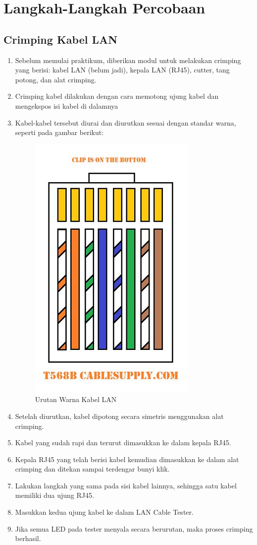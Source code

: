 
\section{Langkah-Langkah Percobaan}

\subsection{Crimping Kabel LAN}

\begin{enumerate}
  \item Sebelum memulai praktikum, diberikan modul untuk melakukan crimping yang berisi: kabel LAN (belum jadi), kepala LAN (RJ45), cutter, tang potong, dan alat crimping.
  \item Crimping kabel dilakukan dengan cara memotong ujung kabel dan mengekspos isi kabel di dalamnya 
  \item Kabel-kabel tersebut diurai dan diurutkan sesuai dengan standar warna, seperti pada gambar berikut:

  \begin{figure}[H]
    \centering
    \includegraphics[width=0.2\linewidth]{P1/img/2.jpg}
    \caption{Urutan Warna Kabel LAN}
    \label{fig:inirujukan}
  \end{figure}

  \item Setelah diurutkan, kabel dipotong secara simetris menggunakan alat crimping.
  \item Kabel yang sudah rapi dan terurut dimasukkan ke dalam kepala RJ45.
  \item Kepala RJ45 yang telah berisi kabel kemudian dimasukkan ke dalam alat crimping dan ditekan sampai terdengar bunyi klik.
  \item Lakukan langkah yang sama pada sisi kabel lainnya, sehingga satu kabel memiliki dua ujung RJ45.
  \item Masukkan kedua ujung kabel ke dalam LAN Cable Tester.
  \item Jika semua LED pada tester menyala secara berurutan, maka proses crimping berhasil.
\end{enumerate}


